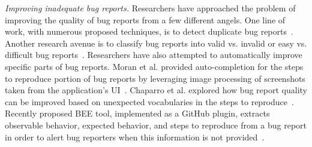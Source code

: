 
\noindent
{\em Improving inadequate bug reports.} Researchers have approached the problem of improving the quality of bug reports from a few different angels. One line of work, with numerous proposed techniques, is to detect duplicate bug reports~\cite{sun2011towards,nguyen2012duplicate,chaparro19reformulating}. Another research avenue is to classify bug reports into valid vs. invalid or easy vs. difficult bug reports~\cite{fan20chaff,zhou2016combining,hooimeijer07modeling}. Researchers have also attempted to automatically improve specific parts of bug reports. Moran et al. provided auto-completion for the steps to reproduce portion of bug reports by leveraging image processing of screenshots taken from the application's UI~\cite{moran15autocompleting}.  Chaparro et al. explored how bug report quality can be improved based on unexpected vocabularies in the steps to reproduce~\cite{Chaparro2019AssessingTQ}. Recently proposed BEE tool, implemented as a GitHub plugin, extracts observable behavior, expected behavior, and steps to reproduce from a bug report in order to alert bug reporters when this information is not provided~\cite{song2020bee}.

